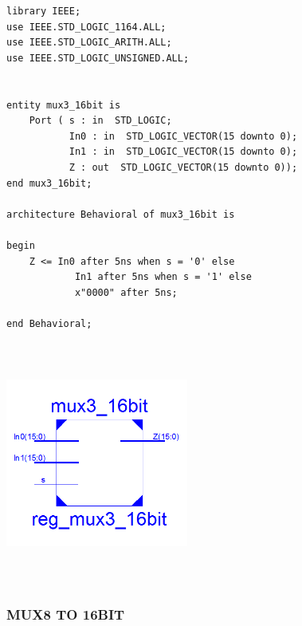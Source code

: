 \documentclass{article}
\begin{document}
\begin{lstlisting}
library IEEE;
use IEEE.STD_LOGIC_1164.ALL;
use IEEE.STD_LOGIC_ARITH.ALL;
use IEEE.STD_LOGIC_UNSIGNED.ALL;


entity mux3_16bit is
    Port ( s : in  STD_LOGIC;
           In0 : in  STD_LOGIC_VECTOR(15 downto 0);
           In1 : in  STD_LOGIC_VECTOR(15 downto 0);
           Z : out  STD_LOGIC_VECTOR(15 downto 0));
end mux3_16bit;

architecture Behavioral of mux3_16bit is

begin
	Z <= In0 after 5ns when s = '0' else
			In1 after 5ns when s = '1' else
			x"0000" after 5ns;

end Behavioral;

\end{lstlisting}

\includegraphics[width=6cm, height=8cm]{mux3to16.png}

\pagebreak
\subsubsection{MUX8 TO 16BIT}\label{sec:result}
\end{document}
